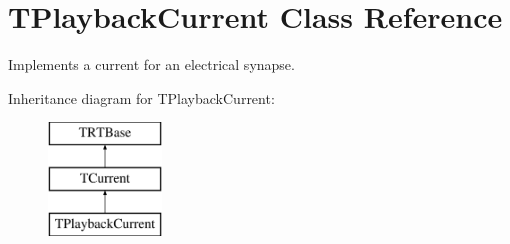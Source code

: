 \hypertarget{class_t_playback_current}{\section{T\+Playback\+Current Class Reference}
\label{class_t_playback_current}
}


Implements a current for an electrical synapse.  


Inheritance diagram for T\+Playback\+Current\+:\begin{figure}[H]
\begin{center}
\leavevmode
\includegraphics[height=3.000000cm]{class_t_playback_current}
\end{center}
\end{figure}
